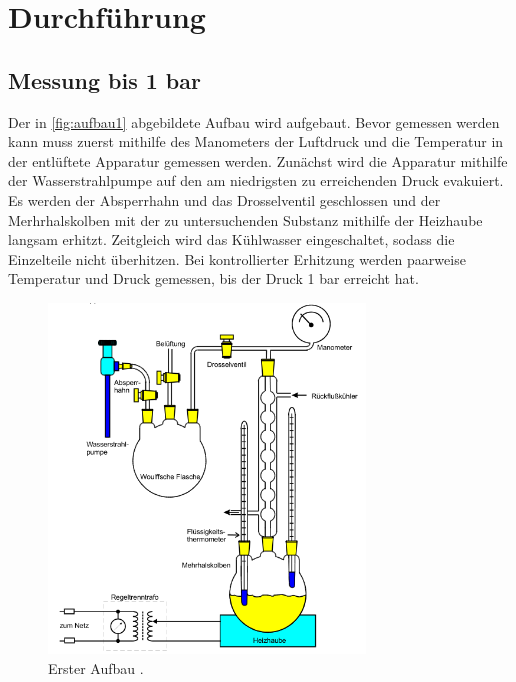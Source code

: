 \section{Durchführung}
\label{sec:Durchführung}

\subsection{Messung bis 1 bar}
Der in \autoref{fig:aufbau1} abgebildete Aufbau wird aufgebaut. Bevor gemessen werden kann muss zuerst mithilfe des Manometers
der Luftdruck und die Temperatur in der entlüftete Apparatur gemessen werden. Zunächst wird die Apparatur mithilfe der 
Wasserstrahlpumpe auf den am niedrigsten zu erreichenden Druck evakuiert. Es werden der Absperrhahn und das Drosselventil geschlossen
und der Merhrhalskolben mit der zu untersuchenden Substanz mithilfe der Heizhaube langsam erhitzt.
Zeitgleich wird das Kühlwasser eingeschaltet, sodass die Einzelteile nicht überhitzen. Bei kontrollierter Erhitzung werden paarweise
Temperatur und Druck gemessen, bis der Druck 1 bar erreicht hat.

\begin{figure}[H]
    \centering
    \includegraphics[width=0.75\textwidth]{daten/aufbau1.png}
    \caption{Erster Aufbau \cite{anleitung}.}
    \label{fig:aufbau1}
\end{figure}

